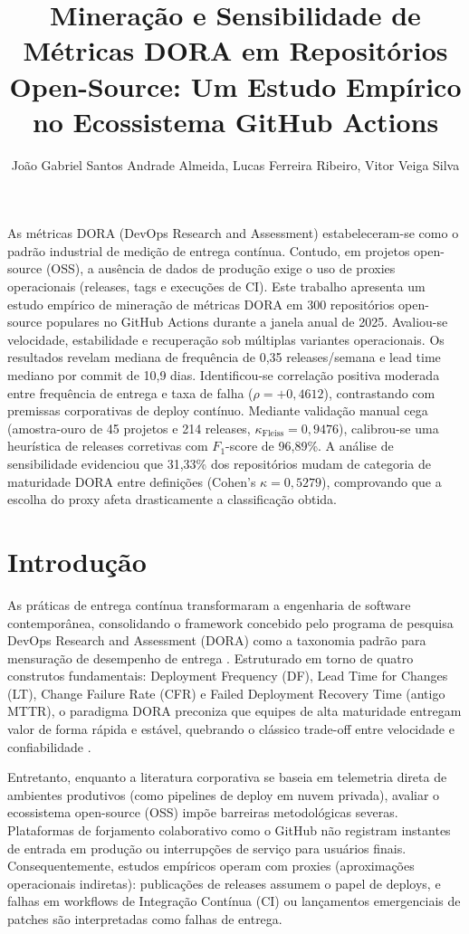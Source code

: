 \documentclass[12pt]{article}
\title{Mineração e Sensibilidade de Métricas DORA em Repositórios Open-Source: Um Estudo Empírico no Ecossistema GitHub Actions}
\author{João Gabriel Santos Andrade Almeida, Lucas Ferreira Ribeiro, Vitor Veiga Silva}
\begin{document}
\maketitle

\begin{resumo}
As métricas DORA (DevOps Research and Assessment) estabeleceram-se como o padrão industrial de medição de entrega contínua. Contudo, em projetos open-source (OSS), a ausência de dados de produção exige o uso de proxies operacionais (releases, tags e execuções de CI). Este trabalho apresenta um estudo empírico de mineração de métricas DORA em 300 repositórios open-source populares no GitHub Actions durante a janela anual de 2025. Avaliou-se velocidade, estabilidade e recuperação sob múltiplas variantes operacionais. Os resultados revelam mediana de frequência de 0,35 releases/semana e lead time mediano por commit de 10,9 dias. Identificou-se correlação positiva moderada entre frequência de entrega e taxa de falha ($\rho = +0{,}4612$), contrastando com premissas corporativas de deploy contínuo. Mediante validação manual cega (amostra-ouro de 45 projetos e 214 releases, $\kappa_{\text{Fleiss}} = 0{,}9476$), calibrou-se uma heurística de releases corretivas com $F_1$-score de 96,89\%. A análise de sensibilidade evidenciou que 31,33\% dos repositórios mudam de categoria de maturidade DORA entre definições (Cohen's $\kappa = 0{,}5279$), comprovando que a escolha do proxy afeta drasticamente a classificação obtida.
\end{resumo}

\section{Introdução}

As práticas de entrega contínua transformaram a engenharia de software contemporânea, consolidando o framework concebido pelo programa de pesquisa DevOps Research and Assessment (DORA) como a taxonomia padrão para mensuração de desempenho de entrega \cite{forsgren2018accelerate}. Estruturado em torno de quatro construtos fundamentais: Deployment Frequency (DF), Lead Time for Changes (LT), Change Failure Rate (CFR) e Failed Deployment Recovery Time (antigo MTTR), o paradigma DORA preconiza que equipes de alta maturidade entregam valor de forma rápida e estável, quebrando o clássico trade-off entre velocidade e confiabilidade \cite{dora2024}.

Entretanto, enquanto a literatura corporativa se baseia em telemetria direta de ambientes produtivos (como pipelines de deploy em nuvem privada), avaliar o ecossistema open-source (OSS) impõe barreiras metodológicas severas. Plataformas de forjamento colaborativo como o GitHub não registram instantes de entrada em produção ou interrupções de serviço para usuários finais. Consequentemente, estudos empíricos operam com proxies (aproximações operacionais indiretas): publicações de releases assumem o papel de deploys, e falhas em workflows de Integração Contínua (CI) ou lançamentos emergenciais de patches são interpretadas como falhas de entrega.
\end{document}
